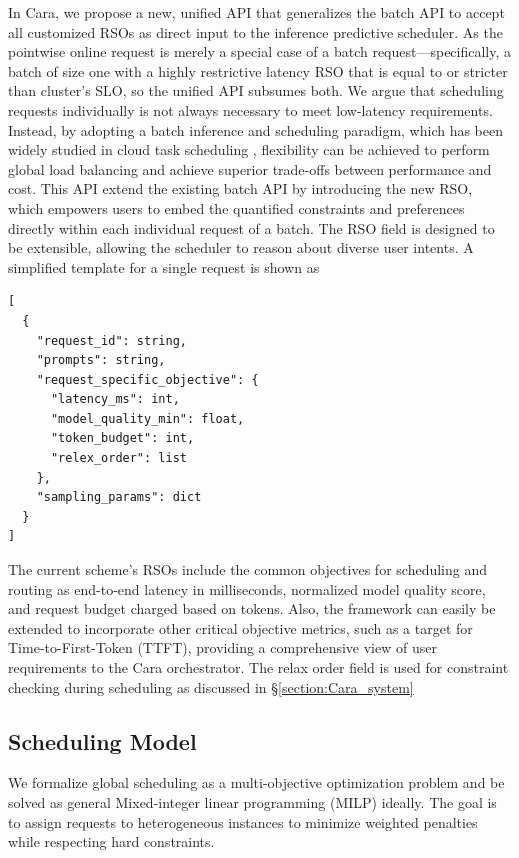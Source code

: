 \documentclass[letterpaper, anonymous, twocolumn, 10pt]{article}
\begin{document}
In Cara, we propose a new, unified API that generalizes the batch API to accept all customized RSOs as direct input to the inference predictive scheduler. As the pointwise online request is merely a special case of a batch request—specifically, a batch of size one with a highly restrictive latency RSO that is equal to or stricter than cluster's SLO, so the unified API subsumes both. We argue that scheduling requests individually is not always necessary to meet low-latency requirements. Instead, by adopting a batch inference and scheduling paradigm, which has been widely studied in cloud task scheduling \cite{eva-eurosys}, flexibility can be achieved to perform global load balancing and achieve superior trade-offs between performance and cost.  This API extend the existing batch API by introducing the new RSO, which empowers users to embed the quantified constraints and preferences directly within each individual request of a batch. The RSO field is designed to be extensible, allowing the scheduler to reason about diverse user intents. A simplified template for a single request is shown as
\begin{minipage}{\linewidth}
\begin{lstlisting}[style=jsonstyle, caption={Schema for Generate API request with RSOs.}, label={lst:api_schema}]
[
  {
    "request_id": string,
    "prompts": string,
    "request_specific_objective": {
      "latency_ms": int,
      "model_quality_min": float,
      "token_budget": int,
      "relex_order": list
    },
    "sampling_params": dict
  }
]
\end{lstlisting}
\end{minipage}
The current scheme's RSOs include the common objectives for scheduling and routing as end-to-end latency in milliseconds, normalized model quality score, and request budget charged based on tokens. Also, the framework can easily be extended to incorporate other critical objective metrics, such as a target for Time-to-First-Token (TTFT), providing a comprehensive view of user requirements to the Cara orchestrator.  The relax order field is used for constraint checking during scheduling as discussed in \S \ref{section:Cara_system}

\subsection{Scheduling Model} \label{section:system_model}

We formalize global scheduling as a multi-objective optimization problem  and be solved as general Mixed-integer linear programming (MILP) ideally. The goal is to assign requests to heterogeneous instances to minimize weighted penalties while respecting hard constraints.
\end{document}
